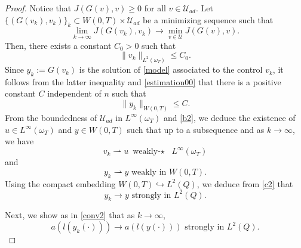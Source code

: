 \documentclass[reqno,twoside]{amsart}
\numberwithin{equation}{section}
\theoremstyle{definition}
\numberwithin{equation}{section}
\def \U {{\mathcal U}}
\def \U {\mathcal{U}}
\begin{document}
\begin{proof}
Notice that $J(G(v),v)\geq 0$ for all $v\in \mathcal{U}_{ad}$. Let $\{(G(v_k),v_k)\}_k\subset W(0,T)\times\mathcal{U}_{ad}$ be a minimizing sequence such that
$$\lim_{k\to \infty}J(G(v_k),v_k)\to \min_{v\in\U}J(G(v),v). $$	
Then, there exists a constant $C_0>0$ such that
\begin{equation*}
	\|v_k\|_{L^2(\omega_T)}\leq C_0.
\end{equation*}
Since $y_k:=G(v_k)$ is the solution of \eqref{model} associated to  the control $v_k$, it follows from the latter inequality and \eqref{estimation00} that there is a positive constant $C$ independent of $n$ such that
\begin{equation}\label{b2}	
	\|y_k\|_{W(0,T)} \leq C.
\end{equation}
From the boundedness of $\U_{ad}$ in $L^\infty(\omega_T)$ and \eqref{b2}, we deduce the existence of  $u\in L^\infty(\omega_T)$ and $y\in W(0,T) $ such that up to a subsequence and as $k\to \infty$, we have
\begin{equation}\label{c1}
	v_k\rightharpoonup u   \text{ weakly-$\star$ } L^\infty(\omega_T)
\end{equation}
and
\begin{equation}\label{c2}
	y_k\rightharpoonup y   \text{ weakly in }  W(0,T).
\end{equation}
Using the compact embedding $W(0,T)\hookrightarrow L^2(Q)$, we deduce from \eqref{c2} that
\begin{equation}\label{c3}
	y_k\to y   \text{ strongly in }  L^2(Q).
\end{equation}

Next, we show as in \eqref{conv2} that as $k\to \infty$,
\begin{equation}\label{c4}
	a(l(y_k(\cdot)))\to a(l(y(\cdot)))   \text{ strongly in }  L^2(Q).
\end{equation}	


\end{proof}
\end{document}
